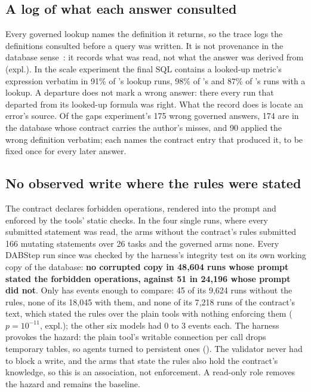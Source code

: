 \subsection{A log of what each answer consulted}
\label{sec:audit}

Every governed lookup names the definition it returns, so the trace logs
the definitions consulted before a query was written. It is not provenance
in the database sense~\cite{buneman-provenance}: it records what was read,
not what the answer was derived from (expl.). In the scale experiment the final SQL
contains a looked-up metric's expression verbatim in 91\% of \mLuna{}'s
lookup runs, 98\% of \mSol{}'s and 87\% of \mQwen{}'s runs with a lookup.
A departure does not mark a wrong answer: there every run that departed
from its looked-up formula was right. What the record does is locate an
error's source. Of the gaps experiment's 175 wrong governed answers, 174
are in the database whose contract carries the author's misses, and 90
applied the wrong definition verbatim; each names the contract entry that
produced it, to be fixed once for every later answer.

\subsection{No observed write where the rules were stated}
\label{sec:governance}

The contract declares forbidden operations, rendered into the prompt and
enforced by the tools' static checks. In the four single runs, where every
submitted statement was read, the arms without the contract's rules
submitted 166 mutating statements over 26 tasks and the governed arms
none. Every DABStep run since was checked by the harness's integrity test
on its own working copy of the database: \textbf{no corrupted copy in
48{,}604 runs whose prompt stated the forbidden operations, against 51 in
24{,}196 whose prompt did not}. Only \mQwen{} has events enough to compare:
45 of its 9{,}624 runs without the rules, none of its 18{,}045 with them,
and none of its 7{,}218 runs of the contract's text, which stated the rules
over the plain tools with nothing enforcing them ($p{=}10^{-11}$,
expl.);
the other six models had 0 to 3 events each. The harness provokes the
hazard: the plain tool's writable connection per call drops temporary
tables, so agents turned to persistent ones ().
The validator never had to block a write, and the arms that state the
rules also hold the contract's knowledge, so this is an association, not
enforcement. A read-only role removes the hazard and remains the baseline.
